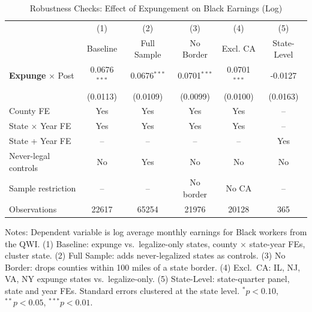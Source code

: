 \begin{table}[h!]
\centering
\caption{Robustness Checks: Effect of Expungement on Black Earnings (Log)}
\label{tab:robustness}
\begin{tabular}{lccccc}
\toprule
 & (1) & (2) & (3) & (4) & (5) \\
 & Baseline & Full Sample & No Border & Excl. CA & State-Level \\
\midrule
\textbf{Expunge} $\times$ Post & 0.0676$^{***}$ & 0.0676$^{***}$ & 0.0701$^{***}$ & 0.0701$^{***}$ & -0.0127 \\
 & (0.0113) & (0.0109) & (0.0099) & (0.0100) & (0.0163) \\
\midrule
County FE & Yes & Yes & Yes & Yes & -- \\
State $\times$ Year FE & Yes & Yes & Yes & Yes & -- \\
State + Year FE & -- & -- & -- & -- & Yes \\
Never-legal controls & No & Yes & No & No & No \\
Sample restriction & -- & -- & No border & No CA & -- \\
Observations & 22617 & 65254 & 21976 & 20128 & 365 \\
\bottomrule
\end{tabular}
\begin{tablenotes}
\small
\item Notes: Dependent variable is log average monthly earnings for Black workers from the QWI. (1) Baseline: expunge vs.~legalize-only states, county $\times$ state-year FEs, cluster state. (2) Full Sample: adds never-legalized states as controls. (3) No Border: drops counties within 100 miles of a state border. (4) Excl.~CA: IL, NJ, VA, NY expunge states vs.~legalize-only. (5) State-Level: state-quarter panel, state and year FEs. Standard errors clustered at the state level. $^{*}p<0.10$, $^{**}p<0.05$, $^{***}p<0.01$.
\end{tablenotes}
\end{table}

